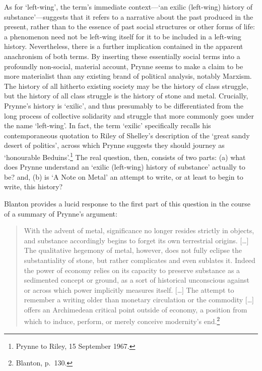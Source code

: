 \documentclass[]{article}
\begin{document}
As for ‘left-wing’, the term’s immediate context—‘an exilic (left-wing)
history of substance’—suggests that it refers to a narrative about the
past produced in the present, rather than to the essence of past social
structures or other forms of life: a phenomenon need not be left-wing
itself for it to be included in a left-wing history. Nevertheless, there
is a further implication contained in the apparent anachronism of both
terms. By inserting these essentially social terms into a profoundly
non-social, material account, Prynne seems to make a claim to be more
materialist than any existing brand of political analysis, notably
Marxism. The history of all hitherto existing society may be the history
of class struggle, but the history of all class struggle is the history
of stone and metal. Crucially, Prynne’s history is ‘exilic’, and thus
presumably to be differentiated from the long process of collective
solidarity and struggle that more commonly goes under the name
‘left-wing’. In fact, the term ‘exilic’ specifically recalls his
contemporaneous quotation to Riley of Shelley’s description of the
‘great sandy desert of politics’, across which Prynne suggests they
should journey as ‘honourable Beduins’.\footnote{Prynne to Riley, 15
  September 1967.} The real question, then, consists of two parts: (a)
what does Prynne understand an ‘exilic (left-wing) history of substance’
actually to be? and, (b) is ‘A Note on Metal’ an attempt to write, or at
least to begin to write, this history?

Blanton provides a lucid response to the first part of this question in
the course of a summary of Prynne’s argument:

\begin{quote}
\singlespacing With the advent of metal, significance no longer resides
strictly in objects, and substance accordingly begins to forget its own
terrestrial origins. {[}\ldots{}{]} The qualitative hegemony of metal,
however, does not fully eclipse the substantiality of stone, but rather
complicates and even sublates it. Indeed the power of economy relies on
its capacity to preserve substance as a sedimented concept or ground, as
a sort of historical unconscious against or across which power
implicitly measures itself. {[}\ldots{}{]} The attempt to remember a
writing older than monetary circulation or the commodity {[}\ldots{}{]}
offers an Archimedean critical point outside of economy, a position from
which to induce, perform, or merely conceive modernity’s end.\footnote{Blanton,
  p.~130.}
\end{quote}
\end{document}
